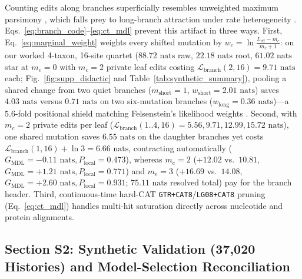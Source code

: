 \documentclass[12pt]{article}
\begin{document}
Counting edits along branches superficially resembles unweighted maximum parsimony \cite{fitch1971toward}, which falls prey to long-branch attraction under rate heterogeneity \cite{felsenstein1978cases}. Eqs.~\eqref{eq:branch_code}--\eqref{eq:ct_mdl} prevent this artifact in three ways. First, Eq.~\eqref{eq:marginal_weight} weights every shifted mutation by $w_c = \ln\frac{L_{\text{eff}} - m_c}{m_c + 1}$: on our worked 4-taxon, 16-site quartet ($88.72\text{ nats}$ raw, $22.18\text{ nats}$ root, $61.02\text{ nats}$ star at $m_e = 0$ with $m_c = 2$ private leaf edits costing $\mathcal{L}_{\text{branch}}(2,16) = 9.71\text{ nats}$ each; Fig.~\ref{fig:supp_didactic} and Table~\ref{tab:synthetic_summary}), pooling a shared change from two quiet branches ($m_{\text{short}} = 1$, $w_{\text{short}} = 2.01\text{ nats}$) saves $4.03\text{ nats}$ versus $0.71\text{ nats}$ on two six-mutation branches ($w_{\text{long}} = 0.36\text{ nats}$)---a $5.6$-fold positional shield matching Felsenstein's likelihood weights \cite{felsenstein1981evolutionary}. Second, with $m_c = 2$ private edits per leaf ($\mathcal{L}_{\text{branch}}(1..4, 16) = 5.56, 9.71, 12.99, 15.72\text{ nats}$), one shared mutation saves $6.55\text{ nats}$ on the daughter branches yet costs $\mathcal{L}_{\text{branch}}(1,16) + \ln 3 = 6.66\text{ nats}$, contracting automatically ($G_{\text{MDL}} = -0.11\text{ nats}, P_{\text{local}} = 0.473$), whereas $m_e = 2$ ($+12.02$ vs.\ $10.81$, $G_{\text{MDL}} = +1.21\text{ nats}, P_{\text{local}} = 0.771$) and $m_e = 3$ ($+16.69$ vs.\ $14.08$, $G_{\text{MDL}} = +2.60\text{ nats}, P_{\text{local}} = 0.931$; $75.11\text{ nats}$ resolved total) pay for the branch header. Third, continuous-time hard-CAT \texttt{GTR+CAT8}/\texttt{LG08+CAT8} pruning (Eq.~\eqref{eq:ct_mdl}) handles multi-hit saturation directly across nucleotide and protein alignments.

\subsection*{Section S2: Synthetic Validation (37,020 Histories) and Model-Selection Reconciliation}
\end{document}
